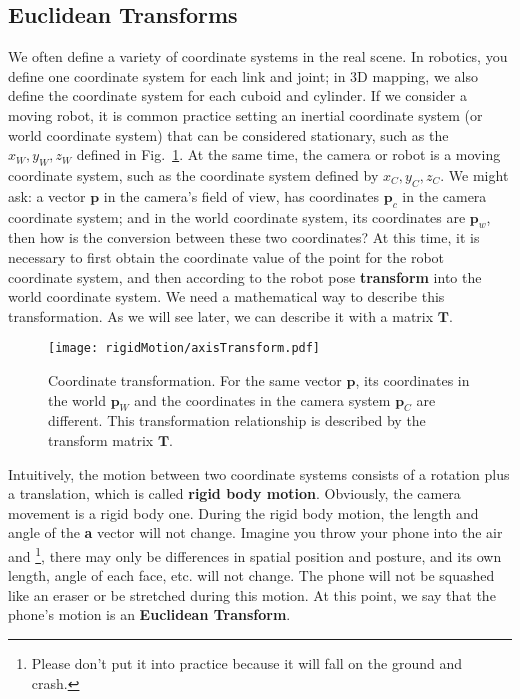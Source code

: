 \subsection{Euclidean Transforms}
We often define a variety of coordinate systems in the real scene. In robotics, you define one coordinate system for each link and joint; in 3D mapping, we also define the coordinate system for each cuboid and cylinder. If we consider a moving robot, it is common practice setting an inertial coordinate system (or world coordinate system) that can be considered stationary, such as the $x_W, y_W, z_W$ defined in Fig.~\ref{fig:axisTransform}. At the same time, the camera or robot is a moving coordinate system, such as the coordinate system defined by $x_C, y_C, z_C$. We might ask: a vector $\mathbf{p}$ in the camera's field of view, has coordinates $\mathbf{p}_c$ in the camera coordinate system; and in the world coordinate system, its coordinates are $ \mathbf{p}_w$, then how is the conversion between these two coordinates? At this time, it is necessary to first obtain the coordinate value of the point for the robot coordinate system, and then according to the robot pose \textbf{transform} into the world coordinate system. We need a mathematical way to describe this transformation. As we will see later, we can describe it with a matrix $\mathbf{T}$.

\begin{figure}[!htp]
    \centering
    \texttt{[image: rigidMotion/axisTransform.pdf]}
    \caption {Coordinate transformation. For the same vector $ \mathbf{p}$, its coordinates in the world $\mathbf{p}_W$ and the coordinates in the camera system $ \mathbf{p}_C$ are different. This transformation relationship is described by the transform matrix $ \mathbf{T} $.}
    \label{fig:axisTransform}
\end{figure}

Intuitively, the motion between two coordinate systems consists of a rotation plus a translation, which is called \textbf {rigid body motion}. Obviously, the camera movement is a rigid body one. During the rigid body motion, the length and angle of the \textbf{a} vector will not change. Imagine you throw your phone into the air and \footnote {Please don't put it into practice because it will fall on the ground and crash.}, there may only be differences in spatial position and posture, and its own length, angle of each face, etc. will not change. The phone will not be squashed like an eraser or be stretched during this motion. At this point, we say that the phone's motion is an \textbf {Euclidean Transform}.


